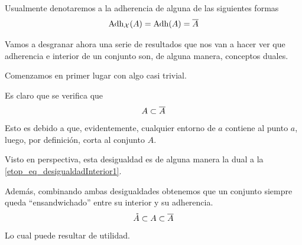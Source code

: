 Usualmente denotaremos a la adherencia de alguna de las siguientes formas
\begin{equation}
\label{etop_eq_adherencia}
\operatorname{\mathrm{Adh}}_{\mathcal{X}}(A)=\operatorname{\mathrm{Adh}}(A)=\overline{A}
\end{equation}

Vamos a desgranar ahora una serie de resultados que nos van a hacer ver que adherencia e interior de un conjunto son, de alguna manera, conceptos duales.

Comenzamos en primer lugar con algo casi trivial.
\begin{obs}
	\label{etop_obs_adherenciaConjunto}
	Es claro que se verifica que
	\begin{equation}
	\label{etop_eq_adherenciaConjunto}
	A\subset\overline{A}
	\end{equation}
	Esto es debido a que, evidentemente, cualquier entorno de $a$ contiene al punto $a$, luego, por definición, corta al conjunto $A$.
	
	Visto en perspectiva, esta desigualdad es de alguna manera la dual a la \eqref{etop_eq_desigualdadInterior1}.
	
	Además, combinando ambas desigualdades obtenemos que un conjunto siempre queda ``ensandwichado'' entre su interior y su adherencia.
	\begin{equation*}
		\mathring{A}\subset A\subset\overline{A}
	\end{equation*}
	Lo cual puede resultar de utilidad.
\end{obs}

